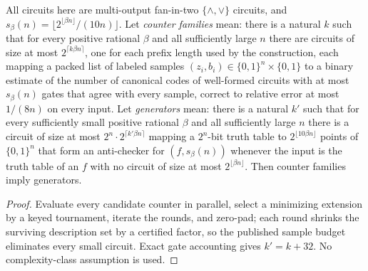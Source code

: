 \begin{theorem}
  \label{thm:meta-counters-to-generators}
  \leanok
  All circuits here are multi-output fan-in-two $\{\wedge,\vee\}$ circuits, and
  $s_\beta(n) = \lfloor 2^{\lfloor \beta n \rfloor}/(10n)\rfloor$. Let
  \emph{counter families} mean: there is a natural $k$ such that for every
  positive rational $\beta$ and all sufficiently large $n$ there are circuits
  of size at most $2^{\lceil k \beta n \rceil}$, one for each prefix length
  used by the construction, each mapping a packed list of labeled samples
  $(z_i, b_i) \in \{0,1\}^n \times \{0,1\}$ to a binary estimate of the number
  of canonical codes of well-formed circuits with at most $s_\beta(n)$ gates
  that agree with every sample, correct to relative error at most $1/(8n)$ on
  every input. Let \emph{generators} mean: there is a natural $k'$ such that
  for every sufficiently small positive rational $\beta$ and all sufficiently
  large $n$ there is a circuit of size at most
  $2^n \cdot 2^{\lceil k' \beta n \rceil}$ mapping a $2^n$-bit truth table to
  $2^{\lfloor 10 \beta n \rfloor}$ points of $\{0,1\}^n$ that form an
  anti-checker for $(f, s_\beta(n))$ whenever the input is the truth table of
  an $f$ with no circuit of size at most $2^{\lfloor \beta n \rfloor}$. Then
  counter families imply generators.
\end{theorem}
\begin{proof}
  \leanok
  Evaluate every candidate counter in parallel, select a minimizing extension
  by a keyed tournament, iterate the rounds, and zero-pad; each round shrinks
  the surviving description set by a certified factor, so the published sample
  budget eliminates every small circuit. Exact gate accounting gives $k' = k +
  32$. No complexity-class assumption is used.
\end{proof}

